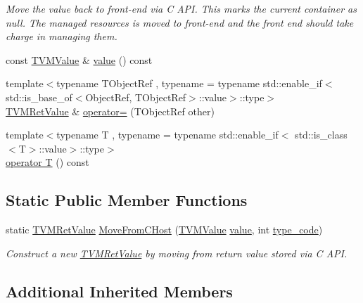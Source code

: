 \begin{DoxyCompactItemize}
\begin{DoxyCompactList}\small\item\em Move the value back to front-\/end via C A\+PI. This marks the current container as null. The managed resources is moved to front-\/end and the front end should take charge in managing them. \end{DoxyCompactList}\item 
const \hyperlink{unionTVMValue}{T\+V\+M\+Value} \& \hyperlink{classtvm_1_1runtime_1_1TVMRetValue_a75696cb65d294217796fbc4f1c22d7f8}{value} () const 
\item 
{\footnotesize template$<$typename T\+Object\+Ref , typename  = typename std\+::enable\+\_\+if$<$             std\+::is\+\_\+base\+\_\+of$<$\+Object\+Ref, T\+Object\+Ref$>$\+::value$>$\+::type$>$ }\\\hyperlink{classtvm_1_1runtime_1_1TVMRetValue}{T\+V\+M\+Ret\+Value} \& \hyperlink{classtvm_1_1runtime_1_1TVMRetValue_a230363e8e5980248aca5a760e0c3ab3d}{operator=} (T\+Object\+Ref other)
\item 
{\footnotesize template$<$typename T , typename  = typename std\+::enable\+\_\+if$<$             std\+::is\+\_\+class$<$\+T$>$\+::value$>$\+::type$>$ }\\\hyperlink{classtvm_1_1runtime_1_1TVMRetValue_a0b9304664e8aa3ffebf46149add6ce03}{operator T} () const 
\end{DoxyCompactItemize}
\subsection*{Static Public Member Functions}
\begin{DoxyCompactItemize}
\item 
static \hyperlink{classtvm_1_1runtime_1_1TVMRetValue}{T\+V\+M\+Ret\+Value} \hyperlink{classtvm_1_1runtime_1_1TVMRetValue_a05a3312e4f335513ba0dbaefcd0c5a2c}{Move\+From\+C\+Host} (\hyperlink{unionTVMValue}{T\+V\+M\+Value} \hyperlink{classtvm_1_1runtime_1_1TVMRetValue_a75696cb65d294217796fbc4f1c22d7f8}{value}, int \hyperlink{classtvm_1_1runtime_1_1TVMPODValue___a5a799e4197f227549cd641b0e753f9b8}{type\+\_\+code})
\begin{DoxyCompactList}\small\item\em Construct a new \hyperlink{classtvm_1_1runtime_1_1TVMRetValue}{T\+V\+M\+Ret\+Value} by moving from return value stored via C A\+PI. \end{DoxyCompactList}\end{DoxyCompactItemize}
\subsection*{Additional Inherited Members}


